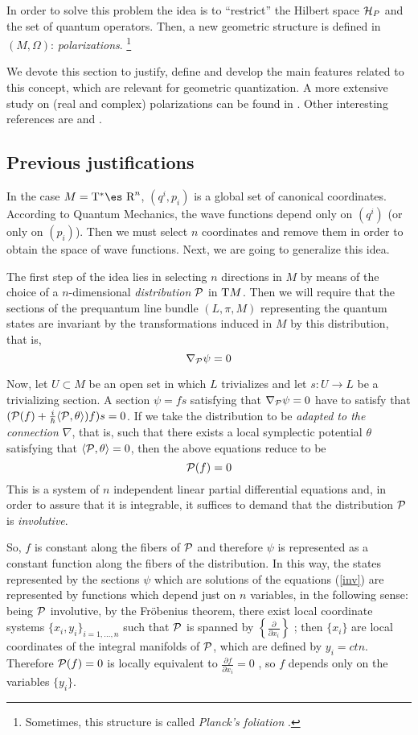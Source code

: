 \documentclass[12pt]{article}
\theoremstyle{plain}
\def\beq{\begin{equation}}
\def\eeq{\end{equation}}
\def\dst{\(}
\def\derpar#1#2{\frac{\partial{#1}}{\partial{#2}}}
\def\P{{\cal P}}
\def\H{{\cal H}}
\def\Real{\mbox{\es R}}
\def\Tan{{\rm T}}
\begin{document}
In order to solve this problem the idea is to ``restrict'' the Hilbert
space $\H_P$
and the set of quantum operators. Then, a new geometric structure is
defined in
$(M,\Omega )$: {\it polarizations}.%
\footnote{Sometimes, this structure is called {\it Planck's foliation}
\cite{AM-78}.
}

We devote this section to justify, define and develop the main features
related to this concept, which are relevant for geometric quantization.
A more extensive study on (real and complex) polarizations can be found
in \cite{Wo-80}.
Other interesting references are \cite{Sn-80} and \cite{Tu-85}.


\subsection{Previous justifications}


In the case $M=\Tan^*\Real^n$,
$(q^i,p_i)$ is a global set of canonical coordinates.
According to Quantum Mechanics, the wave functions
depend only on $(q^i)$ (or only on $(p_i)$).
Then we must select $n$ coordinates and remove them
in order to obtain the space of wave functions.
Next, we are going to generalize this idea.

The first step of the idea lies in selecting
$n$ directions in $M$ by means of the choice of a
$n$-dimensional {\it distribution} $\P$ in $\Tan M$.
Then we will require that the sections of
the prequantum line bundle $(L,\pi ,M)$ representing the quantum states
are invariant by the transformations
induced in $M$ by this distribution, that is,
\beq
\nabla_\P \psi = 0
\label{inv}
\eeq

Now, let $U \subset M$ be an open set
in which $L$ trivializes and let
$s \colon U \to L$ be a trivializing section.
A section $\psi = f s$ satisfying that
$\nabla_\P \psi = 0$
have to satisfy that
$(\P (f) + \frac{i}{\hbar}\langle \P,\theta \rangle )f)s = 0$.
If we take the distribution to be
{\it adapted to the connection $\nabla$},
that is, such that there exists
a local symplectic potential $\theta$ satisfying that
$\langle \P ,\theta \rangle = 0$,
then the above equations reduce to be
$$
\P (f) = 0
$$
This is a system of
$n$ independent linear partial differential equations and,
in order to assure that it is integrable,
it suffices to demand that the distribution $\P$
is {\it involutive}.

So, $f$ is constant along the fibers of $\P$
and therefore $\psi$ is represented as a constant function
along the fibers of the distribution.
In this way, the states represented by the sections $\psi$
which are solutions of the equations
(\ref{inv})
are represented by functions which
depend just on $n$ variables, in the following sense:
being $\P$ involutive, by the Fr\"obenius theorem,
there exist local coordinate systems
$\{ x_i,y_i \}_{i=1,\ldots ,n}$
such that $\P$ is spanned by
\dst\left\{ \derpar{}{x_i} \right\}\) ; then
$\{ x_i \}$ are local coordinates of the integral manifolds of $\P$,
which are defined by $y_i=ctn.$
Therefore $\P (f) = 0$ is locally equivalent to
 \dst\derpar{f}{x_i} = 0\) , so $f$ depends only
 on the variables $\{ y_i\}$.
\end{document}
